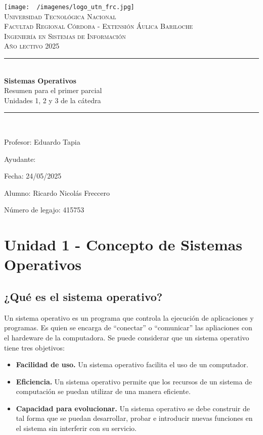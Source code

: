 \documentclass[12pt]{article}
\begin{document}
  \begin{titlepage}
    \centering
    \texttt{[image: ~/imagenes/logo\_utn\_frc.jpg]}\\

    \textsc{
      \LARGE Universidad Tecnológica Nacional\\
      \Large Facultad Regional Córdoba - Extensión Áulica Bariloche\\
      \large Ingeniería en Sistemas de Información\\
      Año lectivo 2025\\[0.5cm]
    }

    \rule{\linewidth}{1.0mm}\\[0.4cm]
    \Huge
    \textbf{Sistemas Operativos}\\
    Resumen para el primer parcial\\[0.2cm]
    \LARGE
    Unidades 1, 2 y 3 de la cátedra
    \rule{\linewidth}{1.0mm}\\
    \large
    \begin{flushleft}
      Profesor: Eduardo Tapia

      Ayudante: 

      Fecha: 24/05/2025
    \end{flushleft}

    \vfill
    \begin{flushright}
      Alumno: Ricardo Nicolás Freccero

      Número de legajo: 415753
    \end{flushright}
  \end{titlepage}

  \restoregeometry
  \tableofcontents
  \newpage

  \section{Unidad 1 - Concepto de Sistemas Operativos}
  \subsection{¿Qué es el sistema operativo?}
  Un sistema operativo es un programa que controla la ejecución de aplicaciones y programas. Es quien se encarga de ``conectar'' o ``comunicar'' las apliaciones con el hardeware de la computadora. Se puede considerar que un sistema operativo tiene tres objetivos:

  \begin{itemize}
    \item \textbf{Facilidad de uso.} Un sistema operativo facilita el uso de un computador.

    \item \textbf{Eficiencia.} Un sistema operativo permite que los recursos de un sistema de computación se puedan utilizar de una manera eficiente.

    \item \textbf{Capacidad para evolucionar.} Un sistema operativo se debe construir de tal forma que se puedan desarrollar, probar e introducir nuevas funciones en el sistema sin interferir con su servicio.
  \end{itemize}
\end{document}
